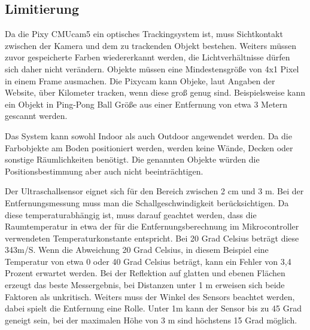   \subsection*{Limitierung}
  Da die Pixy CMUcam5\cite{Pixy} ein optisches Trackingsystem ist, muss Sichtkontakt zwischen der Kamera und dem zu trackenden Objekt bestehen. Weiters müssen zuvor gespeicherte Farben wiedererkannt werden, die Lichtverhältnisse dürfen sich daher nicht verändern.
  Objekte müssen eine Mindestensgröße von 4x1 Pixel in einem Frame ausmachen. Die Pixycam kann Objeke, laut Angaben der Website, über Kilometer tracken, wenn diese groß genug sind. Beispielsweise kann ein Objekt in Ping-Pong Ball Größe aus einer Entfernung von etwa 3 Metern gescannt werden. 

  Das System kann sowohl Indoor als auch Outdoor angewendet werden. Da die Farbobjekte am Boden positioniert werden, werden keine Wände, Decken oder sonstige Räumlichkeiten benötigt. Die genannten Objekte würden die Positionsbestimmung aber auch nicht beeinträchtigen.

  Der Ultraschallsensor eignet sich für den Bereich zwischen 2 cm und 3 m. Bei der Entfernungsmessung muss man die Schallgeschwindigkeit berücksichtigen. Da diese temperaturabhängig \cite{Ultrasonic} ist, muss darauf geachtet werden, dass die Raumtemperatur in etwa der für die Entfernungsberechnung im Mikrocontroller verwendeten Temperaturkonstante entspricht. Bei 20 Grad Celsius beträgt diese 343m/S. Wenn die Abweichung 20 Grad Celsius, in diesem Beispiel eine Temperatur von etwa 0 oder 40 Grad Celsius beträgt, kann ein Fehler von 3,4 Prozent erwartet werden.
  Bei der Reflektion auf glatten und ebenen Flächen erzeugt das beste Messergebnis, bei Distanzen unter 1 m erweisen sich beide Faktoren als unkritisch.
  Weiters muss der Winkel des Sensors beachtet werden, dabei spielt die Entfernung eine Rolle. Unter 1m kann der Sensor bis zu 45 Grad geneigt sein, bei der maximalen Höhe von 3 m sind höchstens 15 Grad möglich.
